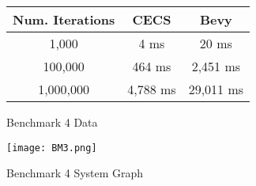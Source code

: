 \documentclass[conference]{IEEEtran}
\begin{document}
\begin{figure}[!htb]
    \begin{center}
    
    \begin{tabular}{||c c c||} 
    \hline
    Num. Iterations & CECS & Bevy  \\ [0.5ex] 
    \hline\hline
    1,000 & 4 ms & 20 ms \\ 
    \hline
    100,000 & 464 ms & 2,451 ms \\
    \hline
    1,000,000 & 4,788 ms & 29,011 ms \\
    \hline
    \end{tabular}
    
    \caption[test]{Benchmark 4 Data}
    \label{Benchmark 4 Data}
    \end{center}
\end{figure}

\begin{figure}[!htb]
    \begin{center}
    \centerline{\texttt{[image: BM3.png]}}
    \caption[test]{Benchmark 4 System Graph}
    \label{Benchmark 4 System Graph}
    \end{center}
\end{figure}
\end{document}
